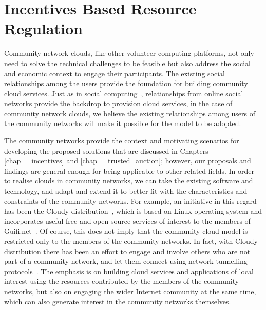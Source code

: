 

\section {Incentives Based Resource Regulation}
\label{sec__incentives_motivation}

Community network clouds, like other volunteer computing platforms, 
not only need to solve the technical challenges to be feasible but also 
address the social and economic context to engage their participants.
The existing social relationships among the users provide the foundation for building community cloud services.
Just as in social computing~\cite{Caton2014}, relationships from online social networks 
provide the backdrop to provision cloud services, 
in the case of community network clouds, we believe the existing
relationships among users of the community networks will make it possible 
for the model to be adopted.

The community networks provide the context and motivating scenarios 
for developing the proposed solutions that are discussed in Chapters \ref{chap__incentives} and \ref{chap__trusted_auction};
however, our proposals and findings are general enough for being applicable to other related fields.
In order to realise clouds in community networks, we can take the existing software and technology, 
and adapt and extend it to better fit with the characteristics and constraints of the community networks. 
For example, an initiative in this regard has been the Cloudy distribution~\cite{Cloudy}, 
which is based on Linux operating system and 
incorporates useful free and open-source services of interest to the members of Guifi.net~\cite{Selimi2015Cloud}. 
Of course, this does not imply that the community cloud model is restricted only to the members of the community networks.
In fact, with Cloudy distribution there has been an effort to engage and involve others who are not part of a community network, 
and let them connect using network tunnelling protocols~\cite{ClommunityTestbed}.
The emphasis is on building cloud services and applications of local interest 
using the resources contributed by the members of the community networks, 
but also on engaging the wider Internet community at the same time, 
which can also generate interest in the community networks themselves.

